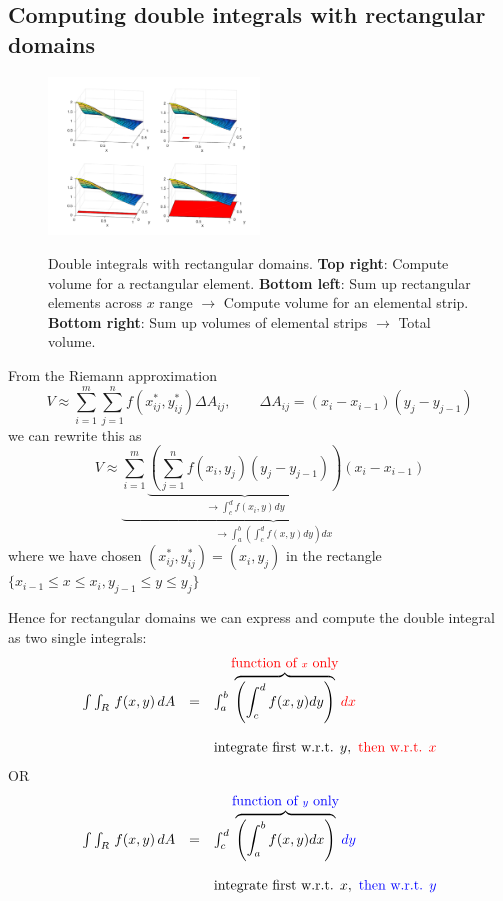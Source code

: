 \documentclass{article}
\begin{document}
\subsection{Computing double integrals with rectangular domains}

\begin{figure}[!ht]
\vspace{-.2cm}
\centering
\includegraphics[width = 0.5\textwidth]{dxdy.pdf}%
\label{Surface1}%
\caption{Double integrals with rectangular domains. \textbf{Top right}: Compute volume for a rectangular element.
\textbf{Bottom left}: Sum up rectangular elements across $x$ range $\to$ Compute volume for an elemental strip. \textbf{Bottom right}: Sum up volumes of elemental strips $\to$ Total volume.}
\end{figure}


From the Riemann approximation
$$
V \approx \sum_{i=1}^m \sum_{j=1}^n f(x_{ij}^{*},y_{ij}^*)\Delta A_{ij}, \qquad \Delta A_{ij} = (x_i-x_{i-1})(y_j - y_{j-1})
$$
we can rewrite this as
$$
V \approx \underbrace{\sum_{i=1}^m \underbrace{\left( \sum_{j=1}^n f(x_{i}{},y_{j}) (y_j - y_{j-1}) \right)}_{\to \int_c^d f(x_i,y) dy} (x_i-x_{i-1})}_{\to \int_a^b 
\left( \int_c^d f(x,y) dy \right) dx}
$$
where we have chosen $(x_{ij}^{*},y_{ij}^*) = (x_i,y_j)$ in the rectangle $\lbrace x_{i-1} \leq x \leq x_i, y_{j-1} \leq y \leq y_j \rbrace$


Hence for rectangular domains we can express and compute the double integral as two single integrals:
$$
\begin{array}{lll}
\int \int_R \, f(x,y) \, dA & = & \int_a^b \overbrace{\left( \int_c^d f(x,y) dy \right) }^{\textcolor{red}{\mbox{function of } { x} \mbox{  only}}}\textcolor{red}{dx}\\
\\
&& \mbox{integrate first w.r.t. } y, \textcolor{red}{\mbox{  then w.r.t. } x }
\end{array}
$$
OR
$$
\begin{array}{lll}
\int \int_R \, f(x,y) \, dA & = & \int_c^d \overbrace{\left( \int_a^b f(x,y) dx \right)}^{\textcolor{blue}{\mbox{function of } { y}  \mbox{  only}}}\textcolor{blue}{dy}\\
\\
&& \mbox{integrate first w.r.t. } x, \textcolor{blue}{\mbox{  then w.r.t. } y}
\end{array}
$$
\end{document}
